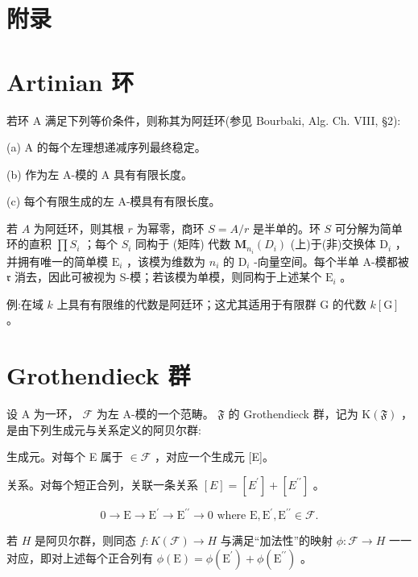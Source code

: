 \documentclass[10pt]{article}
\begin{document}
\section*{附录}

\section*{Artinian 环}

若环 A 满足下列等价条件，则称其为阿廷环(参见 Bourbaki, Alg. Ch. VIII, §2):

(a) A 的每个左理想递减序列最终稳定。

(b) 作为左 A-模的 A 具有有限长度。

(c) 每个有限生成的左 A-模具有有限长度。

若 \(A\) 为阿廷环，则其根 \(r\) 为幂零，商环 \(S = A/r\) 是半单的。环 \(S\) 可分解为简单环的直积 \(\prod {S}_{i}\) ；每个 \({S}_{i}\) 同构于 (矩阵) 代数 \({\mathbf{M}}_{{n}_{i}}\left( {D}_{i}\right)\) (上)于(非)交换体 \({\mathrm{D}}_{i}\) ，并拥有唯一的简单模 \({\mathrm{E}}_{i}\) ，该模为维数为 \({n}_{i}\) 的 \({\mathrm{D}}_{i}\) -向量空间。每个半单 A-模都被 \(\mathfrak{r}\) 消去，因此可被视为 S-模；若该模为单模，则同构于上述某个 \({\mathrm{E}}_{i}\) 。

例:在域 \(k\) 上具有有限维的代数是阿廷环；这尤其适用于有限群 \(\mathrm{G}\) 的代数 \(k\left\lbrack  \mathrm{G}\right\rbrack\) 。

\section*{Grothendieck 群}

设 A 为一环， \(\mathcal{F}\) 为左 A-模的一个范畴。 \(\mathfrak{F}\) 的 Grothendieck 群，记为 \(\mathrm{K}\left( \mathfrak{F}\right)\) ，是由下列生成元与关系定义的阿贝尔群:

生成元。对每个 E 属于 \(\in  \mathcal{F}\) ，对应一个生成元 [E]。

关系。对每个短正合列，关联一条关系 \(\left\lbrack  E\right\rbrack   = \left\lbrack  {E}^{\prime }\right\rbrack   + \left\lbrack  {E}^{\prime \prime }\right\rbrack\) 。

\[
0 \rightarrow  \mathrm{E} \rightarrow  {\mathrm{E}}^{\prime } \rightarrow  {\mathrm{E}}^{\prime \prime } \rightarrow  0\text{ where }\mathrm{E},{\mathrm{E}}^{\prime },{\mathrm{E}}^{\prime \prime } \in  \mathcal{F}.
\]

若 \(H\) 是阿贝尔群，则同态 \(f : K\left( \mathcal{F}\right)  \rightarrow  H\) 与满足“加法性”的映射 \(\phi  : \mathcal{F} \rightarrow  H\) 一一对应，即对上述每个正合列有 \(\phi \left( \mathrm{E}\right)  = \phi \left( {\mathrm{E}}^{\prime }\right)  + \phi \left( {\mathrm{E}}^{\prime \prime }\right)\) 。
\end{document}
